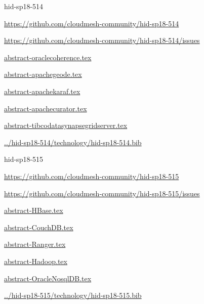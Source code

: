 \begin{IU}

hid-sp18-514

\url{https://github.com/cloudmesh-community/hid-sp18-514}

\url{https://github.com/cloudmesh-community/hid-sp18-514/issues}

\href{https://github.com/cloudmesh-community/hid-sp18-514/blob/master//technology/abstract-oraclecoherence.tex}{abstract-oraclecoherence.tex}

\href{https://github.com/cloudmesh-community/hid-sp18-514/blob/master//technology/abstract-apachegeode.tex}{abstract-apachegeode.tex}

\href{https://github.com/cloudmesh-community/hid-sp18-514/blob/master//technology/abstract-apachekaraf.tex}{abstract-apachekaraf.tex}

\href{https://github.com/cloudmesh-community/hid-sp18-514/blob/master//technology/abstract-apachecurator.tex}{abstract-apachecurator.tex}

\href{https://github.com/cloudmesh-community/hid-sp18-514/blob/master//technology/abstract-tibcodatasynapsegridserver.tex}{abstract-tibcodatasynapsegridserver.tex}

\href{https://github.com/cloudmesh-community/hid-sp18-514/blob/master//technology/hid-sp18-514.bib}{../hid-sp18-514/technology/hid-sp18-514.bib}

\end{IU}


\begin{IU}

hid-sp18-515

\url{https://github.com/cloudmesh-community/hid-sp18-515}

\url{https://github.com/cloudmesh-community/hid-sp18-515/issues}

\href{https://github.com/cloudmesh-community/hid-sp18-515/blob/master//technology/abstract-HBase.tex}{abstract-HBase.tex}

\href{https://github.com/cloudmesh-community/hid-sp18-515/blob/master//technology/abstract-CouchDB.tex}{abstract-CouchDB.tex}

\href{https://github.com/cloudmesh-community/hid-sp18-515/blob/master//technology/abstract-Ranger.tex}{abstract-Ranger.tex}

\href{https://github.com/cloudmesh-community/hid-sp18-515/blob/master//technology/abstract-Hadoop.tex}{abstract-Hadoop.tex}

\href{https://github.com/cloudmesh-community/hid-sp18-515/blob/master//technology/abstract-OracleNosqlDB.tex}{abstract-OracleNosqlDB.tex}

\href{https://github.com/cloudmesh-community/hid-sp18-515/blob/master//technology/hid-sp18-515.bib}{../hid-sp18-515/technology/hid-sp18-515.bib}

\end{IU}


